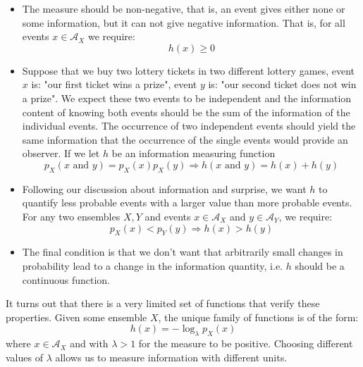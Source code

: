 \begin{itemize}
\item The measure should be non-negative, that is, an event gives either none or some information, but it can not give negative information. That is, for all events $x\in\mathcal A_X$ we require:
         \begin{equation}
         h(x)\geq 0         
         \end{equation}
\item Suppose that we buy two lottery tickets in two different lottery games, event $x$ is: "our first ticket wins a prize", event $y$ is: "our second ticket does not win a prize". 
We expect these two events to be independent and the information content of knowing both events should be the sum of the information of the individual events.
The occurrence of two independent events should yield the same information that the occurrence of the single events would provide an observer. If we let $h$ be an information measuring function
         \begin{equation}
         p_X(x \text{ and } y)=p_X(x) p_X(y)\Rightarrow h(x\text{ and } y) = h(x)+h(y)
         \end{equation}
\item Following our discussion about information and surprise, we want $h$ to quantify less probable events with a larger value than more probable events. For any two ensembles $X,Y$ and events $x\in\mathcal A_X$ and $y\in\mathcal A_Y$, we require:
         \begin{equation}
         \label{eq:incentr}
         p_X(x)< p_Y(y) \Rightarrow h(x)> h(y)
         \end{equation}
\item The final condition is that we don't want that arbitrarily small changes in probability lead to a change in the information quantity, i.e. $h$ should be a continuous function.     
\end{itemize}

It turns out that there is a very limited set of functions that verify these properties. Given some ensemble $X$, the unique family of functions is of the form: 
\begin{equation}
\label{eq:h}
         h(x) = -\log_\lambda p_X(x)
\end{equation}
\noindent where $x\in\mathcal A_X$ and with $\lambda > 1$ for the measure to be positive. 
Choosing different values of $\lambda$ allows us to measure information with different units. 

